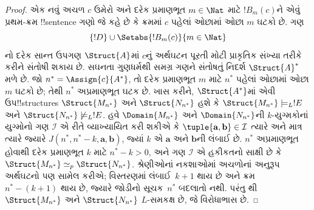 \documentclass[../../../include/open-logic-section]{subfiles}
\begin{document}
\begin{proof}
એક નવું અચળ $c$ ઉમેરો અને દરેક પ્રમાણભૂત $m\in\Nat$ માટે
$!B_m(c)$ને એવું પ્રથમ-ક્રમ !!{sentence} ગણો જે કહે છે કે ક્રમમાં
$c$ પહેલાં ઓછામાં ઓછા $m$ ઘટકો છે. ગણ
\[
  \{!D\} \cup \Setabs{!B_m(c)}{m\in\Nat}
\]
નો દરેક સાન્ત ઉપગણ $\Struct{A}$માં $c$નું અર્થઘટન પૂરતી મોટી પ્રાકૃતિક
સંખ્યા તરીકે કરીને સંતોષી શકાય છે. સઘનતા ગુણધર્મથી સમગ્ર ગણને સંતોષતું
નિદર્શ $\Struct{A}^*$ મળે છે. જો $n^*=\Assign{c}{A^*}$, તો દરેક
પ્રમાણભૂત $m$ માટે $n^*$ પહેલાં ઓછામાં ઓછા $m$ ઘટકો છે; તેથી $n^*$
અપ્રમાણભૂત ઘટક છે.
ખાસ કરીને, $\Struct{A^*}$માં એવી ઉપ!!{structure}s
$\Struct{M_{n^*}}$ અને $\Struct{N_{n^*}}$ હશે કે
$\Struct{M_{n^*}} \models_L !E$ અને $\Struct{N_{n^*}}
\not\models_L !E$. હવે $\Domain{M_{n^*}}$ અને
$\Domain{N_{n^*}}$ની $k$-યુગ્મકોનાં યુગ્મોનો ગણ $\mathcal{I}$ એ રીતે
વ્યાખ્યાયિત કરી શકીએ કે
$\tuple{\mathbf{a}, \mathbf{b}} \in \mathcal{I}$ ત્યારે અને માત્ર
ત્યારે જ્યારે $J(n^*,n^*-k,\mathbf{a},\mathbf{b})$, જ્યાં $k$ એ
$\mathbf{a}$ અને $\mathbf{b}$ની લંબાઈ છે. $n^*$ અપ્રમાણભૂત હોવાથી
દરેક પ્રમાણભૂત $k$ માટે $n^* - k >0$, અને ગણ $\mathcal{I}$ એ હકીકતનો
સાક્ષી છે કે $\Struct{M_{n^*}} \simeq_p \Struct{N_{n^*}}$.
શ્રેણીઓનાં નકશાઓમાં અચળોનાં અનુરૂપ અર્થઘટનો પણ સામેલ કરીએ;
વિસ્તરણમાં લંબાઈ~$k+1$ થાય છે અને ક્રમ~$n^*-(k+1)$ થાય છે, જ્યારે
જોડીનો સૂચક~$n^*$ બદલાતો નથી. પરંતુ
થી $\Struct{M_{n^*}}$ અને
$\Struct{N_{n^*}}$ $L$-સમકક્ષ છે, જે વિરોધાભાસ છે.
\end{proof}
\end{document}
